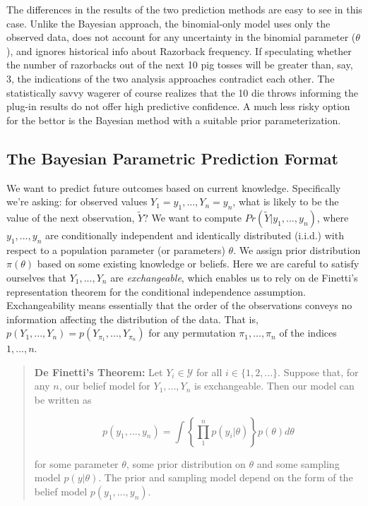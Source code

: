 \documentclass[12pt, a4paper]{article}
\begin{document}

\noindent The differences in the results of the two prediction methods are easy to see in this case. Unlike the Bayesian approach, the binomial-only model uses only the observed data, does not account for any uncertainty in the binomial parameter ($\theta$), and ignores historical info about Razorback frequency.  If speculating whether the number of razorbacks out of the next 10 pig tosses will be greater than, say, 3, the indications of the two analysis approaches contradict each other.  The statistically savvy wagerer of course realizes that the 10 die throws informing the plug-in results do not offer high predictive confidence.  A much less risky option for the bettor is the Bayesian method with a suitable prior parameterization.


\clearpage

  \subsection{The Bayesian Parametric Prediction Format}

\noindent We want to predict future outcomes based on current knowledge.
Specifically we're asking: for observed values $Y_1 = y_1,...,Y_n = y_n$, what
is likely to be the value of the next observation, $\tilde{Y}$?  We want to compute $Pr(\tilde{Y}|y_1,...,y_n)$, where $y_1,...,y_n$ are
conditionally independent and identically distributed (i.i.d.) with respect to  a population parameter (or parameters) $\theta$.  We assign prior distribution
 $\pi(\theta)$ based on some existing knowledge or beliefs.  Here we are careful to satisfy ourselves that $Y_1,...,Y_n$ are \textit{exchangeable}, which
 enables us to rely on de Finetti's representation theorem for the conditional independence assumption.  Exchangeability means essentially that the order of the observations conveys no information affecting the distribution of the data.  That is, $p(Y_1,...,Y_n) = p(Y_{\pi_1},...,Y_{\pi_n})$ for any permutation $\pi_1,...,\pi_n$ of the indices $1,...,n$.\\

\begin{quote}
  \textbf{De Finetti's Theorem:  } Let $Y_i\in\mathcal{Y}$ for all $i\in\{1,2,...\}$.  Suppose that, for any $n$, our belief model for $Y_1,...,Y_n$ is exchangeable. Then our model can be written as

  $$p(y_1,...,y_n) = \int\left\{\prod_1^n p(y_i|\theta)\right\}p(\theta)d\theta$$

  for some parameter $\theta$, some prior distribution on $\theta$ and some sampling model $p(y|\theta)$.  The prior and sampling model depend on the form of the belief model $p(y_1,...,y_n)$.\\
\end{quote}
\end{document}
